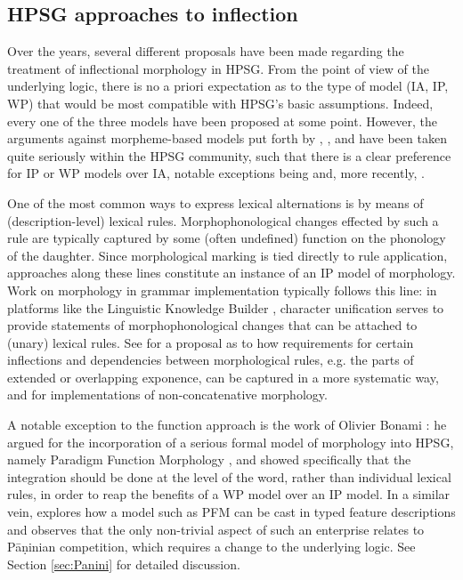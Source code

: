 \documentclass[output=paper
	        ,collection
	        ,collectionchapter
 	        ,biblatex
                ,babelshorthands
                ,newtxmath
                ,draftmode
                ,colorlinks, citecolor=brown
]{langscibook}
\begin{document}
\subsection{HPSG approaches to inflection}
\label{sec:InflHPSG}

Over the years, several different proposals have been made regarding the
treatment of inflectional morphology in HPSG. From the point of view
of the underlying logic, there is no a priori expectation as to the type of model
(IA, IP, WP) that would be most compatible with HPSG's basic
assumptions. Indeed, every one of the three models have been proposed at
some point. However, the arguments against morpheme-based models put
forth by \citet{Matthews72}, \citet{Spencer91}, \citet{Anderson92} and
\citet{Stump01} have been taken quite seriously within the HPSG
community, such that there is a clear preference for IP or WP models over
IA, notable exceptions being \citet{van-eynde_f94} and, more
recently, \citet{Emerson15}.

One of the most common ways to express lexical alternations is by
means of (description-level) lexical rules. Morphophonological changes
effected by such a rule are typically captured by some (often
undefined) function on the phonology of the daughter. Since
morphological marking is tied directly to rule application, approaches
along these lines constitute an instance of an IP model of
morphology. Work on morphology in grammar implementation typically
follows this line: in platforms like the Linguistic Knowledge
Builder  \citep[LKB;][]{Copestake02},
character unification serves to provide statements of
morphophonological changes that can be attached to (unary) lexical
rules. See \citet{Goodman10} for a proposal as to how requirements for
certain inflections and dependencies
between morphological rules, e.g. the parts of extended or overlapping
exponence, can be captured in a more systematic way,
and \citet{Crysmann:15:JLM,Crysmann:2017:JOMO} for implementations of
non-concatenative morphology. 


A notable exception to the function approach is the work of Olivier
Bonami \citep{bonami2015diversity,Bonami14d}: he argued for the incorporation of a
serious formal model of morphology into HPSG, namely Paradigm Function
Morphology  \citep[=PFM;][]{Stump01}, and
showed specifically that the integration should be done at the level
of the word, rather than individual lexical rules, in order to reap
the benefits of a WP model over an IP model. In a similar vein,
\citet{Erjavec94} explores how a model such as PFM can be cast in
typed feature descriptions and observes that the only non-trivial
aspect of such an enterprise relates to Pāṇinian competition, which
requires a change to the underlying logic. See Section
\ref{sec:Panini} for detailed discussion.
\end{document}
